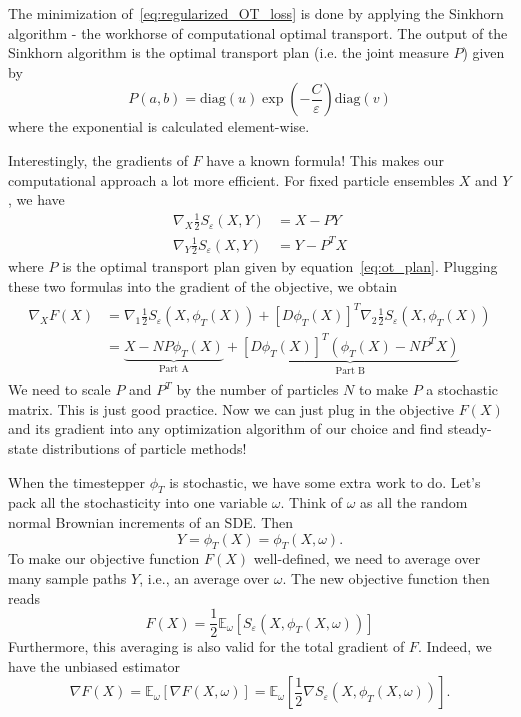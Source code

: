 The minimization of~\eqref{eq:regularized_OT_loss} is done by applying the Sinkhorn algorithm - the workhorse of computational optimal transport. The output of the Sinkhorn algorithm is the optimal transport plan (i.e. the joint measure $P$) given by
\begin{equation} \label{eq:ot_plan}
    P(a, b) = \text{diag}(u) \exp\left(-\frac{C}{\varepsilon}\right) \text{diag}(v)
\end{equation}
where the exponential is calculated element-wise.

Interestingly, the gradients of $F$ have a known formula! This makes our computational approach a lot more efficient. For fixed particle ensembles $X$ and $Y$, we have
\begin{align} \label{eq:sinkhorn_div_gradient}
    \nabla_X \frac{1}{2}S_{\varepsilon}(X, Y) &= X - P Y \\
    \nabla_Y \frac{1}{2}S_{\varepsilon}(X,Y) &= Y - P^T X
\end{align}
where $P$ is the optimal transport plan given by equation~\eqref{eq:ot_plan}. Plugging these two formulas into the gradient of the objective, we obtain
\begin{align} \label{eq:objective_gradient}
\begin{split}
    \nabla_X F(X) &= \nabla_1 \frac{1}{2} S_{\varepsilon}(X, \phi_T(X)) + \left[D\phi_T(X)\right]^T  \nabla_2 \frac{1}{2} S_\varepsilon(X, \phi_T(X)) \\ &= \underbrace{X - NP \phi_T(X)}_{\text{Part A}} + \underbrace{\left[D\phi_T(X)\right]^T \left(\phi_T(X) - NP^T X\right)}_{\text{Part B}}
\end{split}
\end{align} We need to scale $P$ and $P^T$ by the number of particles $N$ to make $P$ a stochastic matrix. This is just good practice. Now we can just plug in the objective $F(X)$ and its gradient into any optimization algorithm of our choice and find steady-state distributions of particle methods!

When the timestepper $\phi_T$ is stochastic, we have some extra work to do. Let's pack all the stochasticity into one variable $\omega$. Think of $\omega$ as all the random normal Brownian increments of an SDE. Then 
\begin{equation}
Y = \phi_T(X) = \phi_T(X, \omega).
\end{equation}
To make our objective function $F(X)$ well-defined, we need to average over many sample paths $Y$, i.e., an average over $\omega$. The new objective function then reads
\begin{equation}
    F(X) = \frac{1}{2}\mathbb{E}_{\omega}\left[S_{\varepsilon}\left(X, \phi_T(X,\omega)\right)\right]
\end{equation}
Furthermore, this averaging is also valid for the total gradient of $F$. Indeed, we have the unbiased estimator
\begin{equation}
    \nabla F(X) = \mathbb{E}_\omega\left[ \nabla F(X, \omega)\right] = \mathbb{E}_\omega\left[ \frac{1}{2} \nabla S_\varepsilon(X, \phi_T(X, \omega))\right].
\end{equation}

